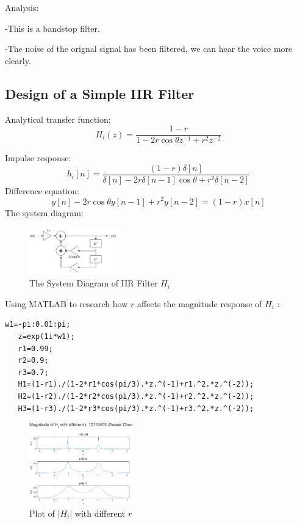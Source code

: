 \documentclass[journal]{IEEEtran}
\begin{document}
 \textcolor[rgb]{0,0.6,1}{Analysis:}


\textcolor[rgb]{0,0.6,1}{-}This is a bandstop filter.

\textcolor[rgb]{0,0.6,1}{-}The noise of the orignal signal has been filtered, we can hear the voice more clearly.





\subsection{Design of a Simple IIR Filter}

Analytical transfer function:
\[
H_i(z)=\frac{1-r}{1-2r\cos\theta z^{-1}+r^2z^{-2}}
\]

Impulse response:
\[h_{i}[n] = \frac{(1-r)\delta [n]}{\delta [n]-2r\delta [n-1] \cos \theta +r^{2} \delta [n-2]}\]
Difference equation:
\[y[n]-2 r \cos \theta y[n-1]+r^{2} y[n-2]=(1-r) x[n]\]
The system diagram:

\begin{figure}[H]
   \centering
   \includegraphics[width=0.35\textwidth]{1.png} %
\caption{The System Diagram of IIR Filter \(H_i\)}
 \end{figure}

Using MATLAB to research how \(r\) affects the magnitude response of \(H_i\) :


\begin{lstlisting}[style=Matlab-editor]
   w1=-pi:0.01:pi;
   z=exp(1i*w1);
   r1=0.99;
   r2=0.9;
   r3=0.7;
   H1=(1-r1)./(1-2*r1*cos(pi/3).*z.^(-1)+r1.^2.*z.^(-2));
   H2=(1-r2)./(1-2*r2*cos(pi/3).*z.^(-1)+r2.^2.*z.^(-2));
   H3=(1-r3)./(1-2*r3*cos(pi/3).*z.^(-1)+r3.^2.*z.^(-2));
\end{lstlisting}


\begin{figure}[htbp]
   \centering
   \includegraphics[width=0.4\textwidth]{41.png} %
\caption{Plot of \(\lvert H_{i}\rvert\) with different \(r\)}
 \end{figure}
\end{document}

